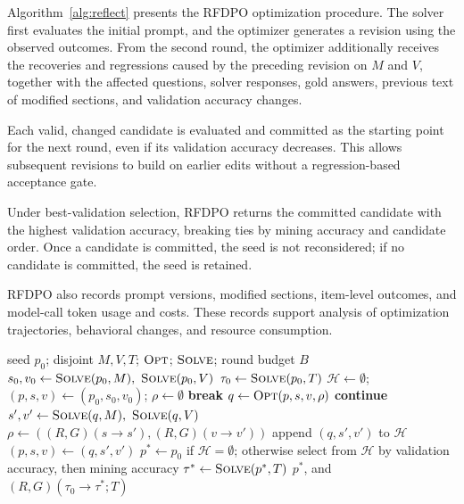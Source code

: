 \documentclass[10pt]{article} %
\begin{document}
Algorithm~\ref{alg:reflect} presents the RFDPO optimization procedure. The solver first evaluates the initial prompt, and the optimizer generates a revision using the observed outcomes. From the second round, the optimizer additionally receives the recoveries and regressions caused by the preceding revision on $M$ and $V$, together with the affected questions, solver responses, gold answers, previous text of modified sections, and validation accuracy changes.

Each valid, changed candidate is evaluated and committed as the starting point for the next round, even if its validation accuracy decreases. This allows subsequent revisions to build on earlier edits without a regression-based acceptance gate.

Under best-validation selection, RFDPO returns the committed candidate with the highest validation accuracy, breaking ties by mining accuracy and candidate order. Once a candidate is committed, the seed is not reconsidered; if no candidate is committed, the seed is retained.

RFDPO also records prompt versions, modified sections, item-level outcomes, and model-call token usage and costs. These records support analysis of optimization trajectories, behavioral changes, and resource consumption.

\begin{algorithm}[!htbp]
\caption{RFDPO optimization with edit-effect feedback}
\label{alg:reflect}
\small
\begin{algorithmic}[1]
\Require seed $p_0$; disjoint $M,V,T$; $\textsc{Opt}$; $\textsc{Solve}$; round budget $B$
\State $s_0,v_0 \gets \textsc{Solve}(p_0,M),\ \textsc{Solve}(p_0,V)$
\State $\tau_0 \gets \textsc{Solve}(p_0,T)$ 
\State $\mathcal{H}\gets\emptyset$; $(p,s,v)\gets(p_0,s_0,v_0)$; $\rho\gets\emptyset$
   \State \textbf{break} \EndIf
  \State $q\gets\textsc{Opt}(p,s,v,\rho)$ 
   \State \textbf{continue} \EndIf
  \State $s',v'\gets\textsc{Solve}(q,M),\ \textsc{Solve}(q,V)$
  \State $\rho\gets((R,G)(s\!\to\!s'),(R,G)(v\!\to\!v'))$
  \State append $(q,s',v')$ to $\mathcal{H}$ 
  \State $(p,s,v)\gets(q,s',v')$
\EndFor
\State $p^*\gets p_0$ if $\mathcal{H}=\emptyset$; otherwise select from $\mathcal{H}$
\Statex \hspace{\algorithmicindent} by validation accuracy, then mining accuracy
\State $\tau^* \gets \textsc{Solve}(p^*,T)$ 
\State \Return $p^*$, and $(R,G)(\tau_0\!\to\!\tau^*;T)$
\end{algorithmic}
\end{algorithm}
\end{document}
